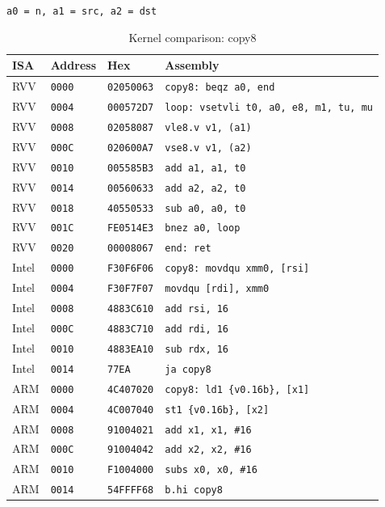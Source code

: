 \begin{table}[htbp]
\centering
\caption{Kernel comparison: copy8}
\begingroup
\scriptsize
\setlength{\tabcolsep}{4pt}
\noindent \texttt{a0 = n, a1 = src, a2 = dst}\par
\vspace{0.6ex}
\begin{tabular}{@{}l|l|l|p{7.2cm}@{}}
\toprule
ISA & Address & Hex & Assembly \\
\midrule
RVV & \texttt{0000} & \texttt{02050063} & \texttt{copy8: beqz a0, end} \\
RVV & \texttt{0004} & \texttt{000572D7} & \texttt{loop: vsetvli t0, a0, e8, m1, tu, mu} \\
RVV & \texttt{0008} & \texttt{02058087} & \texttt{vle8.v v1, (a1)} \\
RVV & \texttt{000C} & \texttt{020600A7} & \texttt{vse8.v v1, (a2)} \\
RVV & \texttt{0010} & \texttt{005585B3} & \texttt{add a1, a1, t0} \\
RVV & \texttt{0014} & \texttt{00560633} & \texttt{add a2, a2, t0} \\
RVV & \texttt{0018} & \texttt{40550533} & \texttt{sub a0, a0, t0} \\
RVV & \texttt{001C} & \texttt{FE0514E3} & \texttt{bnez a0, loop} \\
RVV & \texttt{0020} & \texttt{00008067} & \texttt{end: ret} \\
\midrule
Intel & \texttt{0000} & \texttt{F30F6F06} & \texttt{copy8: movdqu xmm0, [rsi]} \\
Intel & \texttt{0004} & \texttt{F30F7F07} & \texttt{movdqu [rdi], xmm0} \\
Intel & \texttt{0008} & \texttt{4883C610} & \texttt{add rsi, 16} \\
Intel & \texttt{000C} & \texttt{4883C710} & \texttt{add rdi, 16} \\
Intel & \texttt{0010} & \texttt{4883EA10} & \texttt{sub rdx, 16} \\
Intel & \texttt{0014} & \texttt{77EA} & \texttt{ja copy8} \\
\midrule
ARM & \texttt{0000} & \texttt{4C407020} & \texttt{copy8: ld1 \{v0.16b\}, [x1]} \\
ARM & \texttt{0004} & \texttt{4C007040} & \texttt{st1 \{v0.16b\}, [x2]} \\
ARM & \texttt{0008} & \texttt{91004021} & \texttt{add x1, x1, \#16} \\
ARM & \texttt{000C} & \texttt{91004042} & \texttt{add x2, x2, \#16} \\
ARM & \texttt{0010} & \texttt{F1004000} & \texttt{subs x0, x0, \#16} \\
ARM & \texttt{0014} & \texttt{54FFFF68} & \texttt{b.hi copy8} \\
\bottomrule
\end{tabular}
\endgroup
\end{table}
\noindent{}\par
